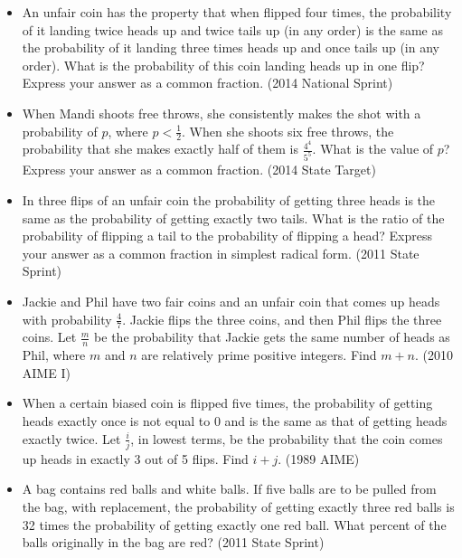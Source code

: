 \documentclass{article}
\begin{document}
\begin{itemize}

\item An unfair coin has the property that when flipped four times, the probability of it landing twice heads up and twice tails up (in any order) is the same as the probability of it landing three times heads up and once tails up (in any order). What is the probability of this coin landing heads up in one flip? Express your answer as a common fraction. (2014 National Sprint)

\item When Mandi shoots free throws, she consistently makes the shot with a probability of $p$, where $p<\frac{1}{2}$. When she shoots six free throws, the probability that she makes exactly half of them is $\frac{4^4}{5^5}$. What is the value of $p$? Express your answer as a common fraction. (2014 State Target)

\item In three flips of an unfair coin the probability of getting three heads is the same as the probability of getting exactly two tails. What is the ratio of the probability of flipping a tail to the probability of flipping a head? Express your answer as a common fraction in simplest radical form. (2011 State Sprint)

\item Jackie and Phil have two fair coins and an unfair coin that comes up heads with probability $\frac{4}{7}$. Jackie flips the three coins, and then Phil flips the three coins. Let $\frac{m}{n}$ be the probability that Jackie gets the same number of heads as Phil, where $m$ and $n$ are relatively prime positive integers. Find $m+n$. (2010 AIME I)

\item When a certain biased coin is flipped five times, the probability of getting heads exactly once is not equal to $0$ and is the same as that of getting heads exactly twice. Let $\frac{i}{j}$, in lowest terms, be the probability that the coin comes up heads in exactly 3 out of 5 flips. Find $i+j$. (1989 AIME)

\item A bag contains red balls and white balls. If five balls are to be pulled from the bag, with replacement, the probability of getting exactly three red balls is 32 times the probability of getting exactly one red ball. What percent of the balls originally in the bag are red? (2011 State Sprint)


\end{itemize}
\end{document}
